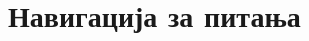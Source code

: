 \documentclass[aspectratio=169]{beamer}
\begin{document}
\section*{Навигација за питања}
{\begin{frame}[noframenumbering]{\secname}
    \begin{columns}[t]
	\footnotesize
        \begin{column}{0.5\linewidth}
            \tableofcontents[sections={2-5}]
        \end{column}
        \begin{column}{0.5\linewidth}
            \tableofcontents[sections={6-}]
        \end{column}
    \end{columns}
\end{frame}}
\end{document}
